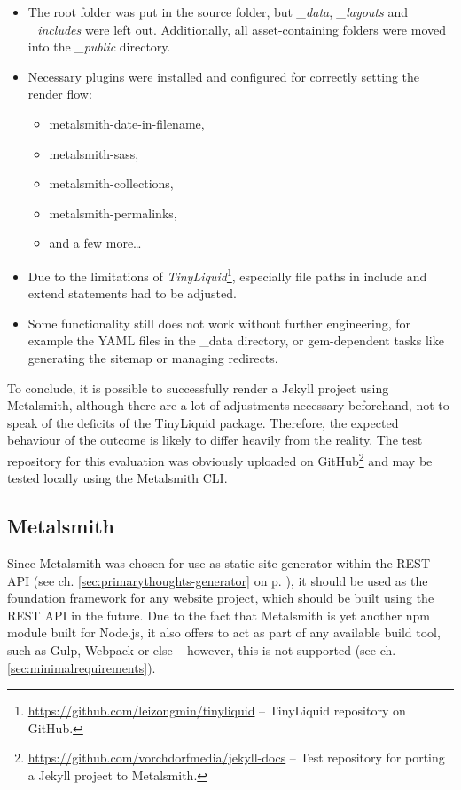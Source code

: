 \begin{itemize}
  \item The root folder was put in the source folder, but \emph{\_data}, \emph{\_layouts} and \emph{\_includes} were left out. Additionally, all asset-containing folders were moved into the \emph{\_public} directory.
  \item Necessary plugins were installed and configured for correctly setting the render flow:
  \begin{itemize}
    \item metalsmith-date-in-filename,
    \item metalsmith-sass,
    \item metalsmith-collections,
    \item metalsmith-permalinks,
    \item and a few more\ldots
  \end{itemize}
  \item Due to the limitations of \emph{TinyLiquid}\footnote{\url{https://github.com/leizongmin/tinyliquid} -- TinyLiquid repository on GitHub.}, especially file paths in include and extend statements had to be adjusted.
  \item Some functionality still does not work without further engineering, for example the YAML files in the \_data directory, or gem-dependent tasks like generating the sitemap or managing redirects.
\end{itemize}

To conclude, it is possible to successfully render a Jekyll project using Metalsmith, although there are a lot of adjustments necessary beforehand, not to speak of the deficits of the TinyLiquid package. Therefore, the expected behaviour of the outcome is likely to differ heavily from the reality. The test repository for this evaluation was obviously uploaded on GitHub\footnote{\url{https://github.com/vorchdorfmedia/jekyll-docs} -- Test repository for porting a Jekyll project to Metalsmith.} and may be tested locally using the Metalsmith CLI.

\subsection{Metalsmith}
Since Metalsmith was chosen for use as static site generator within the REST API (see ch. \ref{sec:primarythoughts-generator} on p. \pageref{sec:primarythoughts-generator}), it should be used as the foundation framework for any website project, which should be built using the REST API in the future. Due to the fact that Metalsmith is yet another npm module built for Node.js, it also offers to act as part of any available build tool, such as Gulp, Webpack or else -- however, this is not supported (see ch. \ref{sec:minimalrequirements}).

